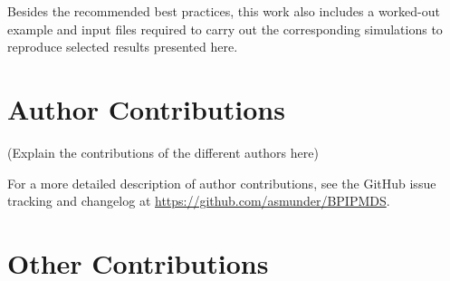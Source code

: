 \documentclass[9pt,bestpractices]{livecoms}
\newcommand{\githubrepository}{\url{https://github.com/asmunder/BPIPMDS}}  %
\begin{document}
Besides the recommended best practices, this work also includes a worked-out
example and input files required to carry out the corresponding simulations to
reproduce selected results presented here.


%
%


\section{Author Contributions}
%

(Explain the contributions of the different authors here)

For a more detailed description of author contributions,
see the GitHub issue tracking and changelog at \githubrepository.

\section{Other Contributions}
%
\end{document}
